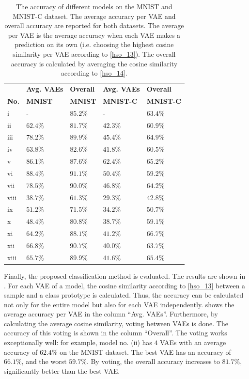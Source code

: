 \begin{table}[h] 
    \centering
	 \begin{tabular}{l l l l l}
	 	& \textbf{Avg. VAEs} & \textbf{Overall} & \textbf{Avg. VAEs} & \textbf{Overall}\\
    	\textbf{No.} & \textbf{MNIST} & \textbf{MNIST} & \textbf{MNIST-C} & \textbf{MNIST-C}\\
        \hline
		i & - & $85.2\%$ & - & $63.4\%$ \\
		
		ii & $62.4\%$ & $81.7\%$ & $42.3\%$ & $60.9\%$ \\
		iii & $78.2\%$ & $89.9\%$ & $45.4\%$ & $64.9\%$ \\
		iv & $63.8\%$ & $82.6\%$ & $41.8\%$ & $60.5\%$  \\
		v & $86.1\%$ & $87.6\%$ & $62.4\%$ & $65.2\%$ \\
		vi & $88.4\%$ & $91.1\%$ & $50.4\%$ & $59.2\%$ \\
		vii & $78.5\%$ & $90.0\%$ & $46.8\%$ & $64.2\%$ \\
		
		viii & $38.7\%$ & $61.3\%$ & $29.3\%$ & $42.8\%$ \\
		ix & $51.2\%$ & $71.5\%$ & $34.2\%$ & $50.7\%$ \\
		x & $48.4\%$ & $80.8\%$ & $38.7\%$ & $59.1\%$  \\
		xi & $64.2\%$ & $88.1\%$ & $41.2\%$ & $66.7\%$ \\
		xii & $66.8\%$ & $90.7\%$ & $40.0\%$ & $63.7\%$ \\
		xiii & $65.7\%$ & $89.9\%$ & $41.6\%$ & $65.4\%$ \\
    \end{tabular}
    \caption[Accuracy of different architectures]{The accuracy of different models on the MNIST and MNIST-C dataset. The average accuracy per VAE and overall accuracy are reported for both datasets. The average per VAE is the average accuracy when each VAE makes a prediction on its own (i.e. choosing the highest cosine similarity per VAE according to \eqref{hso_13}). The overall accuracy is calculated by averaging the cosine similarity according to \eqref{hso_14}.}
\end{table}


Finally, the proposed classification method is evaluated. The results are shown in .
For each VAE of a model, the cosine similarity according to \eqref{hso_13} between a sample and a class prototype is calculated. Thus, the accuracy can be calculated not only for the entire model but also for each VAE independently.  shows the average accuracy per VAE in the column ``Avg. VAEs''. Furthermore, by calculating the average cosine similarity, voting between VAEs is done. The accuracy of this voting is shown in the column ``Overall''. The voting works exceptionally well: for example, model no. (ii) has $4$ VAEs with an average accuracy of $62.4\%$ on the MNIST dataset. The best VAE has an accuracy of $66.1\%$, and the worst $59.7\%$. By voting, the overall accuracy increases to $81.7\%$, significantly better than the best VAE.


